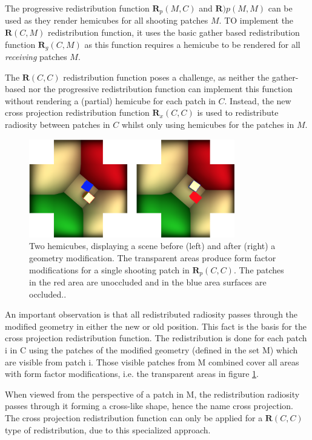 The progressive redistribution function $\mathbf{R}_p(M,C)$ and $\mathbf{R})p(M,M)$ can be used as they render hemicubes for all shooting patches $M$. TO implement the $\mathbf{R}(C,M)$ redistribution function, it uses the basic gather based redistribution function $\mathbf{R}_g(C,M)$ as this function requires a hemicube to be rendered for all \textit{receiving} patches $M$. 

The $\mathbf{R}(C,C)$ redistribution function poses a challenge, as neither the gather-based nor the progressive redistribution function can implement this function without rendering a (partial) hemicube for each patch in $C$. Instead, the new cross projection redistribution function $\mathbf{R}_x(C,C)$ is used to redistribute radiosity between patches in $C$ whilst only using hemicubes for the patches in $M$.

\begin{figure}\label{f:two-hemicubes}
	\begin{center}
		\includegraphics[width=0.8\textwidth]{graphics/gi/path-38}
	\end{center}
	\caption{Two hemicubes, displaying a scene before (left) and after (right) a geometry modification. The transparent areas produce form factor modifications for a single shooting patch in $\mathbf{R}_p(C,C)$. The patches in the red area are unoccluded and in the blue area surfaces are occluded..}
\end{figure}

An important observation is that all redistributed radiosity passes through the modified geometry in either the new or old position. This fact is the basis for the cross projection redistribution function. The redistribution is done for each patch i in C using the patches of the modified geometry (defined in the set M) which are visible from patch i. Those visible patches from M combined cover all areas with form factor modifications, i.e. the transparent areas in figure \ref{f:two-hemicubes}.

When viewed from the perspective of a patch in M, the redistribution radiosity passes through it forming a cross-like shape, hence the name cross projection. The cross projection redistribution function can only be applied for a $\mathbf{R}(C,C)$ type of redistribution, due to this specialized approach.

